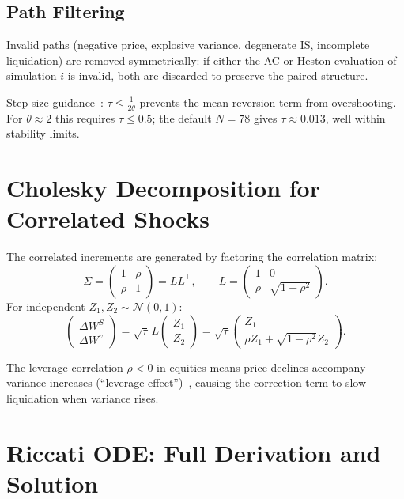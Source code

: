 \documentclass[11pt]{article}
\begin{document}
\subsection{Path Filtering}

Invalid paths (negative price, explosive variance, degenerate IS, incomplete liquidation)
are removed symmetrically: if either the AC or Heston evaluation of simulation $i$ is
invalid, both are discarded to preserve the paired structure.

Step-size guidance~\cite{kloeden1992numerical}: $\tau \leq \frac{1}{2\theta}$ prevents
the mean-reversion term from overshooting. For $\theta \approx 2$ this requires $\tau \leq 0.5$;
the default $N = 78$ gives $\tau \approx 0.013$, well within stability limits.

\section{Cholesky Decomposition for Correlated Shocks}
\label{app:cholesky}

The correlated increments are generated by factoring the correlation matrix:
\[
\Sigma = \begin{pmatrix}1&\rho\\\rho&1\end{pmatrix} = LL^\top,\qquad
L = \begin{pmatrix}1&0\\\rho&\sqrt{1-\rho^2}\end{pmatrix}.
\]
For independent $Z_1, Z_2\sim\mathcal{N}(0,1)$:
\[
\begin{pmatrix}\Delta W^S\\\Delta W^v\end{pmatrix}
= \sqrt{\tau}\,L\begin{pmatrix}Z_1\\Z_2\end{pmatrix}
= \sqrt{\tau}\begin{pmatrix}Z_1\\\rho Z_1+\sqrt{1-\rho^2}Z_2\end{pmatrix}.
\]

The leverage correlation $\rho<0$ in equities means price declines accompany variance
increases (``leverage effect'')~\cite{black1976studies}, causing the correction term
to slow liquidation when variance rises.

\section{Riccati ODE: Full Derivation and Solution}
\label{app:riccati}
\end{document}
